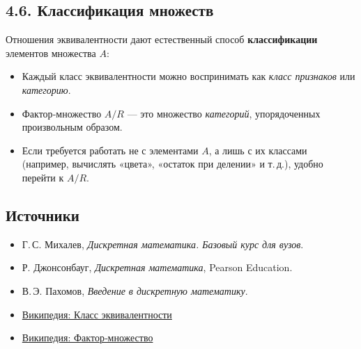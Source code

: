 \documentclass{article}
\begin{document}
\subsection*{4.6. Классификация множеств}

Отношения эквивалентности дают естественный способ \textbf{классификации} элементов множества $A$:
\begin{itemize}[leftmargin=*]
  \item Каждый класс эквивалентности можно воспринимать как \emph{класс признаков} или \emph{категорию}.
  \item Фактор‑множество $A/R$ — это множество \emph{категорий}, упорядоченных произвольным образом.
  \item Если требуется работать не с элементами $A$, а лишь с их классами (например, вычислять «цвета», «остаток при делении» и т.\,д.), удобно перейти к $A/R$.
\end{itemize}

\subsection*{Источники}

\begin{itemize}
  \item Г.\,С. Михалев, \emph{Дискретная математика. Базовый курс для вузов}.
  \item Р. Джонсонбауг, \emph{Дискретная математика}, Pearson Education.
  \item В.\,Э. Пахомов, \emph{Введение в дискретную математику}.
  \item \href{https://ru.wikipedia.org/wiki/Класс_эквивалентности}{Википедия: Класс эквивалентности}
  \item \href{https://ru.wikipedia.org/wiki/Фактор-множество}{Википедия: Фактор‑множество}
\end{itemize}
\end{document}
